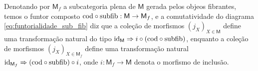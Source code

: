 \begin{obs}
  Denotando por $\mathsf{M}_{f}$ a subcategoria plena de $\mathsf{M}$ gerada pelos objeos fibrantes, temos o funtor composto $\mathrm{cod} \circ \mathrm{subfib}: \mathsf{M} \to \mathsf{M}_{f}$, e a comutatividade do diagrama \eqref{eq:funtorialidade_sub_fib} diz que a coleção de morfismos $(j_{X})_{X \in \mathsf{M}}$ define uma transformação natural do tipo $\mathrm{id}_{\mathsf{M}} \Rightarrow i \circ (\mathrm{cod} \circ \mathrm{subfib})$, enquanto a coleção de morfismos $(j_{X})_{X \in \mathsf{M}_{f}}$ define uma transformação natural $\mathrm{id}_{\mathsf{M}_{f}} \Rightarrow (\mathrm{cod} \circ \mathrm{subfib}) \circ i$, onde $i: \mathsf{M}_{f} \to \mathsf{M}$ denota o morfismo de inclusão.
\end{obs}

